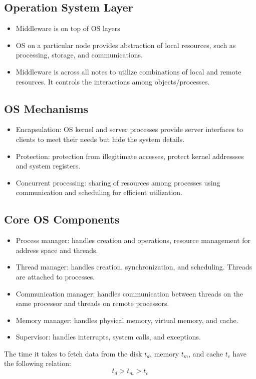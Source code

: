 \documentclass{math}
\begin{document}
\subsection*{Operation System Layer}
\begin{itemize}
  \item Middleware is on top of OS layers
  \item OS on a particular node provides abstraction of local resources, such
  as processing, storage, and communications.
  \item Middleware is across all notes to utilize combinations of local and
  remote resources. It controls the interactions among objects/processes.
\end{itemize}

\subsection*{OS Mechanisms}
\begin{itemize}
  \item Encapsulation: OS kernel and server processes provide server interfaces
  to clients to meet their needs but hide the system details.
  \item Protection: protection from illegitimate accesses, protect kernel
  addressses and system registers.
  \item Concurrent processing: sharing of resources among processes using
  communication and scheduling for efficient utilization.
\end{itemize}

\subsection*{Core OS Components}
\begin{itemize}
  \item Process manager: handles creation and operations, resource management
  for address space and threads.
  \item Thread manager: handles creation, synchronization, and scheduling.
  Threads are attached to processes.
  \item Communication manager: handles communication between threads on the same
  processor and threads on remote processors.
  \item Memory manager: handles physical memory, virtual memory, and cache.
  \item Supervisor: handles interrupts, system calls, and exceptions.
\end{itemize}
The time it takes to fetch data from the disk \( t_d \), memory \( t_m \), and
cache \( t_c \) have the following relation:
\[ t_d > t_m > t_c \]
\end{document}
